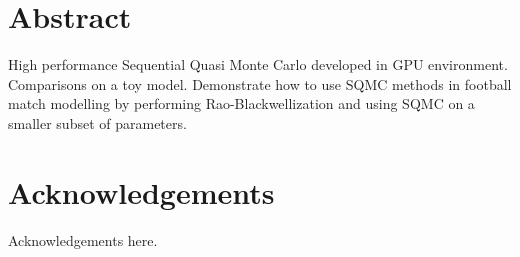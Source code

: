 \documentclass[12pt,a4paper,oneside]{report}
\begin{document}

\makedissertationtitle


\chapter*{Abstract}
High performance Sequential Quasi Monte Carlo developed in GPU environment. Comparisons on a toy model. Demonstrate how to use SQMC methods in football match modelling by performing Rao-Blackwellization and using SQMC on a smaller subset of parameters.

\chapter*{Acknowledgements}
Acknowledgements here.

\tableofcontents

\clearpage
{}

% 
% 
% 
% 

\appendix
% 

\clearpage


\end{document}
